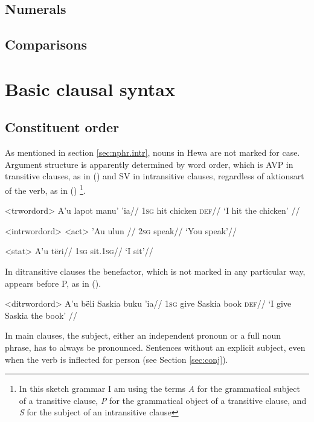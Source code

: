 \documentclass[12pt]{article}
\begin{document}
\subsection{Numerals}

\subsection{Comparisons}

\section{Basic clausal syntax}

\subsection{Constituent order}

As mentioned in section \ref{sec:nphr.intr}, nouns in Hewa are not marked for case. Argument structure is apparently determined by word order, which is AVP in transitive clauses, as in () and SV in intransitive clauses, regardless of aktionsart of the verb, as in () \footnote{In this sketch grammar I am using the terms \textit{A} for the grammatical subject of a transitive clause, \textit{P} for the grammatical object of a transitive clause, and \textit{S} for the subject of an intransitive clause}.

\ex<trwordord>
\begingl %
\gla A'u lapot manu' 'ia//
\glb \textsc{1sg} hit chicken \textsc{def}//
\glft `I hit the chicken' // 
\endgl
\xe

\pex<intrwordord> %
\a<act> %
\begingl %
\gla 'Au ulun //
\glb \textsc{2sg} speak//
\glft `You speak'//
\endgl

\a<stat> %
\begingl %
\gla A'u tëri//
\glb \textsc{1sg} sit.\textsc{1sg}//
\glft `I sit'// 
\endgl
\xe

In ditransitive clauses the benefactor, which is not marked in any particular way, appears before P, as in ().

\ex<ditrwordord>
\begingl %
\gla A'u bëli Saskia buku 'ia//
\glb \textsc{1sg} give Saskia book \textsc{def}//
\glft `I give Saskia the book' // 
\endgl
\xe 

In main clauses, the subject, either an independent pronoun or a full noun phrase, has to always be pronounced. Sentences without an explicit subject, even when the verb is inflected for person (see Section \ref{sec:conj}).
\end{document}
